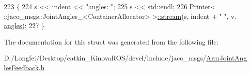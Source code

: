 \begin{DoxyCode}
223   \{
224     s << indent << \textcolor{stringliteral}{"angles: "};
225     s << std::endl;
226     Printer< ::jaco\_msgs::JointAngles\_<ContainerAllocator> >\hyperlink{structros_1_1message__operations_1_1Printer_3_01_1_1jaco__msgs_1_1ArmJointAnglesFeedback___3_01ContainerAllocator_01_4_01_4_ae72c3cd80cbbccd8e562e29482f56e45}{::stream}(s, indent + \textcolor{stringliteral}{"  "}, v.
      \hyperlink{structjaco__msgs_1_1ArmJointAnglesFeedback___a5b3d327fd594aa0715666bf1c95359e4}{angles});
227   \}
\end{DoxyCode}


The documentation for this struct was generated from the following file\+:\begin{DoxyCompactItemize}
\item 
D\+:/\+Longfei/\+Desktop/catkin\+\_\+\+Kinova\+R\+O\+S/devel/include/jaco\+\_\+msgs/\hyperlink{ArmJointAnglesFeedback_8h}{Arm\+Joint\+Angles\+Feedback.\+h}\end{DoxyCompactItemize}

